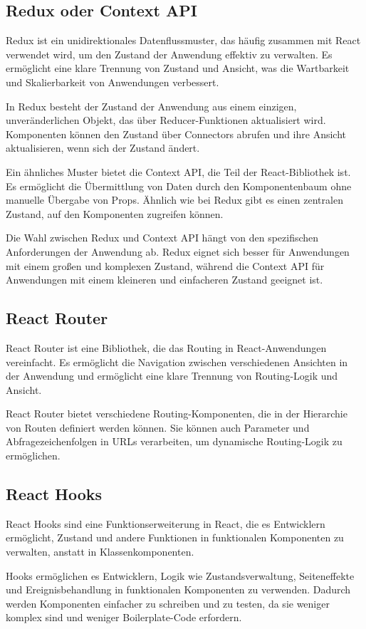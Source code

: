 \subsection{Redux oder Context API}
Redux ist ein unidirektionales Datenflussmuster, das häufig zusammen mit React verwendet wird, um den Zustand der Anwendung effektiv zu verwalten. Es ermöglicht eine klare Trennung von Zustand und Ansicht, was die Wartbarkeit und Skalierbarkeit von Anwendungen verbessert.

In Redux besteht der Zustand der Anwendung aus einem einzigen, unveränderlichen Objekt, das über Reducer-Funktionen aktualisiert wird. Komponenten können den Zustand über Connectors abrufen und ihre Ansicht aktualisieren, wenn sich der Zustand ändert.

Ein ähnliches Muster bietet die Context API, die Teil der React-Bibliothek ist. Es ermöglicht die Übermittlung von Daten durch den Komponentenbaum ohne manuelle Übergabe von Props. Ähnlich wie bei Redux gibt es einen zentralen Zustand, auf den Komponenten zugreifen können.

Die Wahl zwischen Redux und Context API hängt von den spezifischen Anforderungen der Anwendung ab. Redux eignet sich besser für Anwendungen mit einem großen und komplexen Zustand, während die Context API für Anwendungen mit einem kleineren und einfacheren Zustand geeignet ist.

\subsection{React Router}
React Router ist eine Bibliothek, die das Routing in React-Anwendungen vereinfacht. Es ermöglicht die Navigation zwischen verschiedenen Ansichten in der Anwendung und ermöglicht eine klare Trennung von Routing-Logik und Ansicht.

React Router bietet verschiedene Routing-Komponenten, die in der Hierarchie von Routen definiert werden können. Sie können auch Parameter und Abfragezeichenfolgen in URLs verarbeiten, um dynamische Routing-Logik zu ermöglichen.

\subsection{React Hooks}
React Hooks sind eine Funktionserweiterung in React, die es Entwicklern ermöglicht, Zustand und andere Funktionen in funktionalen Komponenten zu verwalten, anstatt in Klassenkomponenten.

Hooks ermöglichen es Entwicklern, Logik wie Zustandsverwaltung, Seiteneffekte und Ereignisbehandlung in funktionalen Komponenten zu verwenden. Dadurch werden Komponenten einfacher zu schreiben und zu testen, da sie weniger komplex sind und weniger Boilerplate-Code erfordern.

